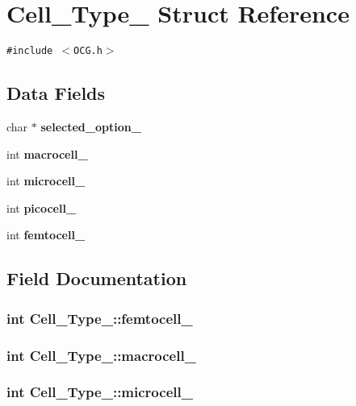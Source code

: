 \section{Cell\_\-Type\_\- Struct Reference}
\label{structCell__Type__}
{\tt \#include $<$OCG.h$>$}

\subsection*{Data Fields}
\begin{CompactItemize}
\item 
char $\ast$ {\bf selected\_\-option\_\-}
\item 
int {\bf macrocell\_\-}
\item 
int {\bf microcell\_\-}
\item 
int {\bf picocell\_\-}
\item 
int {\bf femtocell\_\-}
\end{CompactItemize}


\subsection{Field Documentation}
\subsubsection[{femtocell\_\-}]{\setlength{\rightskip}{0pt plus 5cm}int {\bf Cell\_\-Type\_\-::femtocell\_\-}}\label{structCell__Type___477d485f7110413e93890147af288b1e}


\subsubsection[{macrocell\_\-}]{\setlength{\rightskip}{0pt plus 5cm}int {\bf Cell\_\-Type\_\-::macrocell\_\-}}\label{structCell__Type___96366b71099110afacc413c96f0b0fd7}


\subsubsection[{microcell\_\-}]{\setlength{\rightskip}{0pt plus 5cm}int {\bf Cell\_\-Type\_\-::microcell\_\-}}\label{structCell__Type___9f857fe94f4e84050fbc2ece4bd07f50}


